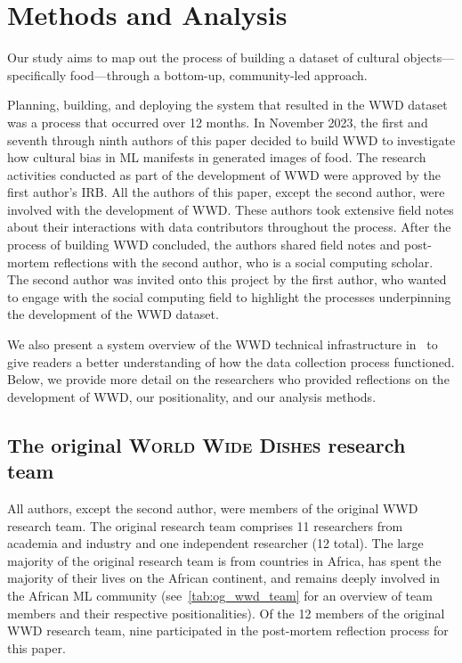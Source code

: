 \section{Methods and Analysis}\label{sec:methods}
Our study aims to map out the process of building a dataset of cultural objects---specifically food---through a bottom-up, community-led approach. 

Planning, building, and deploying the system that resulted in the \textsc{WWD} dataset was a process that occurred over 12 months. In November 2023, the first and seventh through ninth authors of this paper decided to build \textsc{WWD} to investigate how cultural bias in ML manifests in generated images of food. The research activities conducted as part of the development of \textsc{WWD} were approved by the first author's IRB. All the authors of this paper, except the second author, were involved with the development of \textsc{WWD}. These authors took extensive field notes about their interactions with data contributors throughout the process. After the process of building \textsc{WWD} concluded, the authors shared field notes and post-mortem reflections with the second author, who is a social computing scholar. The second author was invited onto this project by the first author, who wanted to engage with the social computing field to highlight the processes underpinning the development of the \textsc{WWD} dataset. 

We also present a system overview of the \textsc{WWD} technical infrastructure in~ to give readers a better understanding of how the data collection process functioned. Below, we provide more detail on the researchers who provided reflections on the development of \textsc{WWD}, our positionality, and our analysis methods. 

\subsection{The original \textsc{World Wide Dishes} research team}
All authors, except the second author, were members of the original \textsc{WWD} research team. The original research team comprises 11 researchers from academia and industry and one independent researcher (12 total). The large majority of the original research team is from countries in Africa, has spent the majority of their lives on the African continent, and remains deeply involved in the African ML community (see~\cref{tab:og_wwd_team} for an overview of team members and their respective positionalities). Of the 12 members of the original \textsc{WWD} research team, nine participated in the post-mortem reflection process for this paper. 

